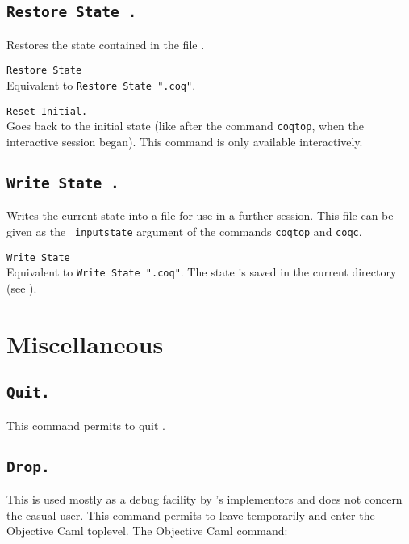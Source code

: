 \subsection{\tt Restore State \str.}
  Restores the state contained in the file \str.

\begin{Variants}
\item {\tt Restore State \ident}\\
 Equivalent to {\tt Restore State "}{\ident}{\tt .coq"}.
\item {\tt Reset Initial.}\\ 
  Goes back to the initial state (like after the command {\tt coqtop},
  when the interactive session began). This command is only available
  interactively.
\end{Variants}

\subsection{\tt Write State \str.}
Writes the current state into a file \str{} for
use in a further session. This file can be given as the {\tt
  inputstate} argument of the commands {\tt coqtop} and {\tt coqc}.

\begin{Variants}
\item {\tt Write State \ident}\\
 Equivalent to {\tt Write State "}{\ident}{\tt .coq"}.
 The state is saved in the current directory (see \pageref{Pwd}).
\end{Variants}

\section{Miscellaneous}

\subsection{\tt Quit.}
This command permits to quit \Coq.

\subsection{\tt Drop.}\label{Drop}

This is used mostly as a debug facility by \Coq's implementors
and does not concern the casual user.
This command permits to leave {\Coq} temporarily and enter the
Objective Caml toplevel. The Objective Caml command:

